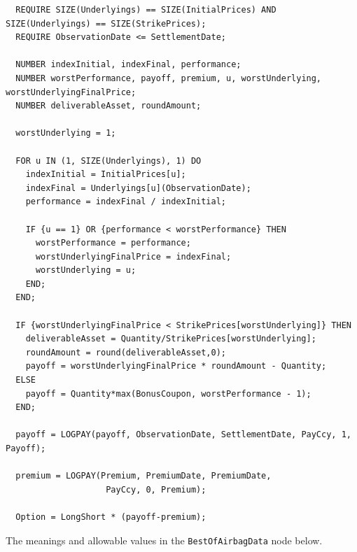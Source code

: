 \begin{listing}[hbt]
\begin{verbatim}
  REQUIRE SIZE(Underlyings) == SIZE(InitialPrices) AND SIZE(Underlyings) == SIZE(StrikePrices);
  REQUIRE ObservationDate <= SettlementDate;

  NUMBER indexInitial, indexFinal, performance;
  NUMBER worstPerformance, payoff, premium, u, worstUnderlying, worstUnderlyingFinalPrice;
  NUMBER deliverableAsset, roundAmount;
  
  worstUnderlying = 1;

  FOR u IN (1, SIZE(Underlyings), 1) DO
    indexInitial = InitialPrices[u];
    indexFinal = Underlyings[u](ObservationDate);
    performance = indexFinal / indexInitial;

    IF {u == 1} OR {performance < worstPerformance} THEN
      worstPerformance = performance;
      worstUnderlyingFinalPrice = indexFinal;
      worstUnderlying = u;
    END;
  END;

  IF {worstUnderlyingFinalPrice < StrikePrices[worstUnderlying]} THEN
    deliverableAsset = Quantity/StrikePrices[worstUnderlying];
    roundAmount = round(deliverableAsset,0);
    payoff = worstUnderlyingFinalPrice * roundAmount - Quantity;
  ELSE
    payoff = Quantity*max(BonusCoupon, worstPerformance - 1);
  END;

  payoff = LOGPAY(payoff, ObservationDate, SettlementDate, PayCcy, 1, Payoff);
  
  premium = LOGPAY(Premium, PremiumDate, PremiumDate,
                    PayCcy, 0, Premium);

  Option = LongShort * (payoff-premium);
\end{verbatim}
\caption{Payoff script for a Best of Airbag.}
\label{lst:best_of_airbag}
\end{listing}

The meanings and allowable values in the \lstinline!BestOfAirbagData! node below.

